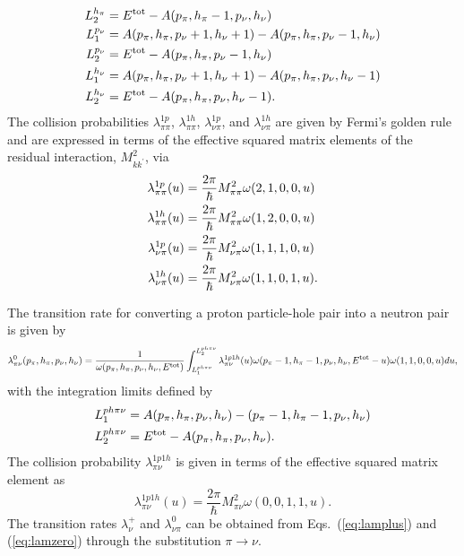 \documentclass[
10pt,
showpacs,preprintnumbers,footinbib,
amsfonts,amsmath,amssymb,
aps,
prc,twocolumn,groupedaddress,superscriptaddress,
showkeys,
nofootinbib
]{revtex4-1}
\begin{document}
\begin{widetext}
\begin{align}
L_2^{h_\pi} & = E^{\rm tot}  - A(p_\pi, h_\pi-1, p_\nu, h_\nu) \notag \\
L_1^{p_\nu} & = A(p_\pi, h_\pi, p_\nu+1, h_\nu+1) - A(p_\pi, h_\pi, p_\nu-1, h_\nu) \notag \\
L_2^{p_\nu} & = E^{\rm tot}  - A(p_\pi, h_\pi, p_\nu-1, h_\nu) \notag\\
L_1^{h_\nu} & = A(p_\pi, h_\pi, p_\nu+1, h_\nu+1) - A(p_\pi, h_\pi, p_\nu, h_\nu-1) \notag \\
L_2^{h_\nu} & = E^{\rm tot}  - A(p_\pi, h_\pi, p_\nu, h_\nu-1).
\end{align}
The collision probabilities $\lambda_{\pi\pi}^{1p}$, $\lambda_{\pi\pi}^{1h}$, $\lambda_{\nu\pi}^{1p}$, and $\lambda_{\nu\pi}^{1h}$ are given by Fermi's golden rule and are expressed in terms of
the effective squared matrix elements of the residual interaction, $M_{kk^\prime}^2$, via
\begin{align}
\lambda_{\pi\pi}^{1p}(u) & = \frac{2\pi}{\hbar} M_{\pi\pi}^2\omega(2,1,0,0,u) \notag\\
\lambda_{\pi\pi}^{1h}(u) & = \frac{2\pi}{\hbar} M_{\pi\pi}^2\omega(1,2,0,0,u) \notag\\
\lambda_{\nu\pi}^{1p}(u) & = \frac{2\pi}{\hbar} M_{\nu\pi}^2\omega(1,1,1,0,u) \notag\\
\lambda_{\nu\pi}^{1h}(u) & = \frac{2\pi}{\hbar} M_{\nu\pi}^2\omega(1,1,0,1,u).
\end{align}

The transition rate for converting a proton particle-hole pair into a neutron pair is given by 
\begin{equation}
\lambda^0_{\pi\nu}(p_\pi, h_\pi, p_\nu, h_\nu) = \frac{1}{\omega(p_\pi, h_\pi, p_\nu, h_\nu,E^{\rm tot})} \int_{L_1^{ph\pi\nu}}^{L_2^{ph\pi\nu}}
                  \lambda_{\pi\nu}^{1p1h}(u)\omega(p_\pi-1, h_\pi-1, p_\nu, h_\nu,E^{\rm tot}-u)\omega(1,1,0,0,u)du,
\label{eq:lamzero}
\end{equation}
with the integration limits defined by
\begin{align}
L_1^{ph\pi\nu} & = A(p_\pi, h_\pi, p_\nu, h_\nu) - (p_\pi-1, h_\pi-1, p_\nu, h_\nu) \notag \\
L_2^{ph\pi\nu} & = E^{\rm tot} - A(p_\pi, h_\pi, p_\nu, h_\nu).
\end{align}
The collision probability $\lambda_{\pi\nu}^{1p1h}$ is given in terms of the effective squared matrix element as
\begin{equation}
\lambda_{\pi\nu}^{1p1h}(u) = \frac{2\pi}{\hbar} M_{\pi\nu}^2\omega(0,0,1,1,u).
\end{equation}
The transition rates $\lambda_\nu^+$ and $\lambda_{\nu\pi}^0$ can be obtained from Eqs.~(\ref{eq:lamplus}) and (\ref{eq:lamzero}) through the substitution $\pi \rightarrow \nu$.


\end{widetext}
\end{document}
